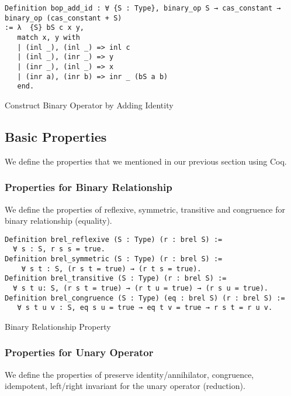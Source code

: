 \begin{listing}[H]
\begin{verbatim}
Definition bop_add_id : ∀ {S : Type}, binary_op S → cas_constant → binary_op (cas_constant + S)
:= λ  {S} bS c x y, 
   match x, y with
   | (inl _), (inl _) => inl c 
   | (inl _), (inr _) => y
   | (inr _), (inl _) => x
   | (inr a), (inr b) => inr _ (bS a b)
   end.
\end{verbatim}
\caption{Construct Binary Operator by Adding Identity} 
\label{coq:def:add_const_ann}
\end{listing}

\subsection{Basic Properties}

We define the properties that we mentioned in our previous section using Coq.

\subsubsection{Properties for Binary Relationship}
We define the properties of reflexive, symmetric, transitive and congruence for binary relationship (equality).

\begin{listing}[H]
\begin{verbatim}
Definition brel_reflexive (S : Type) (r : brel S) :=
  ∀ s : S, r s s = true.
Definition brel_symmetric (S : Type) (r : brel S) := 
    ∀ s t : S, (r s t = true) → (r t s = true). 
Definition brel_transitive (S : Type) (r : brel S) := 
  ∀ s t u: S, (r s t = true) → (r t u = true) → (r s u = true).
Definition brel_congruence (S : Type) (eq : brel S) (r : brel S) := 
   ∀ s t u v : S, eq s u = true → eq t v = true → r s t = r u v.
\end{verbatim}
\caption{Binary Relationship Property} 
\label{coq:def:brel_properties}
\end{listing}

\subsubsection{Properties for Unary Operator}
We define the properties of preserve identity/annihilator, congruence, idempotent, left/right invariant for the unary operator (reduction).

